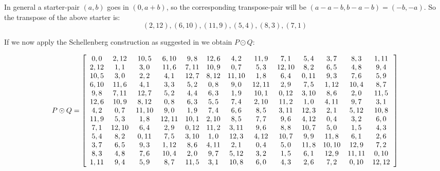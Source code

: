 \documentclass[
  11pt,
  a4paper]{book}\usepackage[]{graphicx}\usepackage[]{xcolor}
\begin{document}
In general a starter-pair $(a, b)$ goes in $(0, a  +b)$,
so the corresponding transpose-pair will be
$(a - a - b, b - a - b) = (-b, -a)$. So the transpose of
the above starter is:
$$(2, 12), (6, 10), (11, 9), (5, 4), (8, 3), (7, 1)$$

If we now apply the Schellenberg construction as suggested
in
\cite{hwangCompleteBalancedHowell1984}
we obtain $P \odot Q$:

\begin{equation}
  P \odot Q = \left[\begin{array}{*{13}c}
   0,0  & 2,12  & 10,5  & 6,10  & 9,8  & 12,6 &  4,2  & 11,9  &  7,1  & 5,4  &  3,7  &  8,3  & 1,11 \\
   2,12 &  1,1  &  3,0  & 11,6  & 7,11 & 10,9 &  0,7  &  5,3  & 12,10 & 8,2  &  6,5  &  4,8  &  9,4 \\
   10,5 &  3,0  &  2,2  &  4,1  & 12,7 & 8,12 & 11,10 &  1,8  &  6,4  & 0,11 &  9,3  &  7,6  &  5,9 \\
   6,10 & 11,6  &  4,1  &  3,3  & 5,2  & 0,8  &  9,0  & 12,11 &  2,9  & 7,5  & 1,12  & 10,4  &  8,7 \\
   9,8  & 7,11  & 12,7  &  5,2  & 4,4  & 6,3  &  1,9  & 10,1  & 0,12  & 3,10 &  8,6  &  2,0  & 11,5 \\
   12,6 & 10,9  & 8,12  &  0,8  & 6,3  & 5,5  &  7,4  & 2,10  & 11,2  & 1,0  & 4,11  &  9,7  &  3,1 \\
   4,2  &  0,7  & 11,10 &  9,0  & 1,9  & 7,4  &  6,6  &  8,5  & 3,11  & 12,3 &  2,1  & 5,12  & 10,8 \\
   11,9 &  5,3  &  1,8  & 12,11 & 10,1 & 2,10 &  8,5  &  7,7  &  9,6  & 4,12 &  0,4  &  3,2  &  6,0 \\
   7,1  & 12,10 &  6,4  &  2,9  & 0,12 & 11,2 & 3,11  &  9,6  &  8,8  & 10,7 &  5,0  &  1,5  &  4,3 \\
   5,4  &  8,2  & 0,11  &  7,5  & 3,10 & 1,0  & 12,3  & 4,12  & 10,7  & 9,9  & 11,8  &  6,1  &  2,6 \\
   3,7  &  6,5  &  9,3  & 1,12  & 8,6  & 4,11 &  2,1  &  0,4  &  5,0  & 11,8 & 10,10 & 12,9  &  7,2 \\
   8,3  &  4,8  &  7,6  & 10,4  & 2,0  & 9,7  & 5,12  &  3,2  &  1,5  & 6,1  & 12,9  & 11,11 & 0,10 \\
   1,11 &  9,4  &  5,9  &  8,7  & 11,5 & 3,1  & 10,8  &  6,0  &  4,3  & 2,6  &  7,2  & 0,10  & 12,12 \\
  \end{array}\right]
\end{equation}
\end{document}
